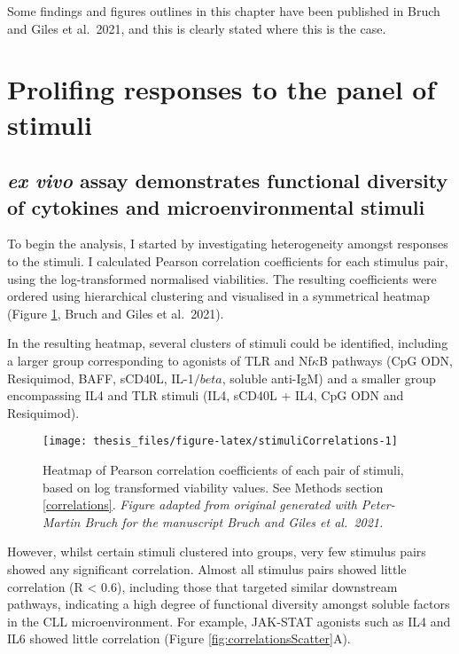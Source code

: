 \documentclass[11pt, a4paper, twosided]{book}
\begin{document}
Some findings and figures outlines in this chapter have been published in Bruch and Giles et al.~2021, and this is clearly stated where this is the case.

\hypertarget{prolifing-responses-to-the-panel-of-stimuli}{%
\section{Prolifing responses to the panel of stimuli}\label{prolifing-responses-to-the-panel-of-stimuli}}

\hypertarget{cytokine-profiling}{%
\subsection{\texorpdfstring{\emph{ex vivo} assay demonstrates functional diversity of cytokines and microenvironmental stimuli}{ex vivo assay demonstrates functional diversity of cytokines and microenvironmental stimuli}}\label{cytokine-profiling}}

To begin the analysis, I started by investigating heterogeneity amongst responses to the stimuli. I calculated Pearson correlation coefficients for each stimulus pair, using the log-transformed normalised viabilities. The resulting coefficients were ordered using hierarchical clustering and visualised in a symmetrical heatmap (Figure \ref{fig:stimuliCorrelations}, Bruch and Giles et al.~2021).

In the resulting heatmap, several clusters of stimuli could be identified, including a larger group corresponding to agonists of TLR and Nf\(\kappa\)B pathways (CpG ODN, Resiquimod, BAFF, sCD40L, IL-1\(/beta\), soluble anti-IgM) and a smaller group encompassing IL4 and TLR stimuli (IL4, sCD40L + IL4, CpG ODN and Resiquimod).


\begin{figure}

{\centering \texttt{[image: thesis\_files/figure-latex/stimuliCorrelations-1]} 

}

\caption{Heatmap of Pearson correlation coefficients of each pair of stimuli, based on log transformed viability values. See Methods section \ref{correlations}. \emph{Figure adapted from original generated with Peter-Martin Bruch for the manuscript Bruch and Giles et al.~2021.}}\label{fig:stimuliCorrelations}
\end{figure}
However, whilst certain stimuli clustered into groups, very few stimulus pairs showed any significant correlation. Almost all stimulus pairs showed little correlation (R \textless{} 0.6), including those that targeted similar downstream pathways, indicating a high degree of functional diversity amongst soluble factors in the CLL microenvironment. For example, JAK-STAT agonists such as IL4 and IL6 showed little correlation (Figure \ref{fig:correlationsScatter}A).
\end{document}
